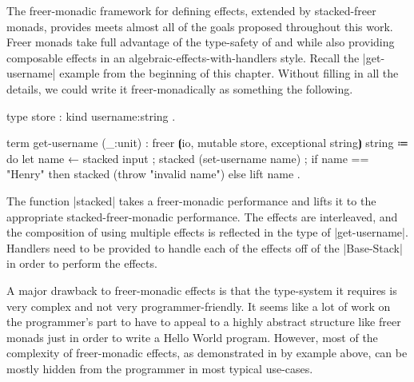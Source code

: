 The freer-monadic framework for defining effects, extended by stacked-freer monads, provides meets almost all of the goals proposed throughout this work.
Freer monads take full advantage of the type-safety of \LangA and \LangC while also providing composable effects in an algebraic-effects-with-handlers style.
Recall the \code|get-username| example from the beginning of this chapter.
Without filling in all the details, we could write it freer-monadically as something the following.
%
\begin{snippet}
type store : kind { username:string }.

term get-username (_:unit)
  : freer $⦗$io, mutable store, exceptional string$⦘$ string
  ≔ do
      { let name ← stacked input
      ; stacked (set-username name)
      ; if name == "Henry"
          then stacked (throw "invalid name")
          else lift name }.
\end{snippet}
%
The function \code|stacked| takes a freer-monadic performance and lifts it to the appropriate stacked-freer-monadic performance.
The effects are interleaved, and the composition of using multiple effects is reflected in the type of \code|get-username|.
Handlers need to be provided to handle each of the effects off of the \code|Base-Stack| in order to perform the effects.

A major drawback to freer-monadic effects is that the type-system it requires is very complex and not very programmer-friendly.
It seems like a lot of work on the programmer's part to have to appeal to a highly abstract structure like freer monads just in order to write a Hello World program.
However, most of the complexity of freer-monadic effects, as demonstrated in by example above, can be mostly hidden from the programmer in most typical use-cases.
